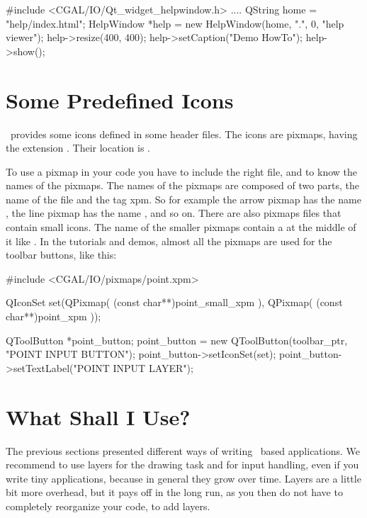 \ccExample
\begin{ccExampleCode}
    #include <CGAL/IO/Qt_widget_helpwindow.h>
	....
    QString home = "help/index.html";
    HelpWindow *help = new HelpWindow(home, ".", 0, "help viewer");
    help->resize(400, 400);
    help->setCaption("Demo HowTo");
    help->show();
\end{ccExampleCode}

\section{Some Predefined Icons}
\label{The predefined icons}

\cgal\ provides some icons defined in some header files. The icons are
pixmaps, having the extension . Their location is .

To use a pixmap in your code you have to include the right file, and
to know the names of the pixmaps. The names of the pixmaps are
composed of two parts, the name of the file and the tag xpm. So for
example the arrow pixmap has the name , the line
pixmap has the name , and so on. There are also 
pixmaps files that contain small icons. The name of the smaller 
pixmaps contain a  at the middle of it like .
In the tutorials and demos, almost all the pixmaps are used for the 
toolbar buttons, like this:

\ccExample
\begin{ccExampleCode}
    
    #include <CGAL/IO/pixmaps/point.xpm>
    
    QIconSet set(QPixmap( (const char**)point_small_xpm ),
                  QPixmap( (const char**)point_xpm ));

    QToolButton *point_button;
    point_button = new QToolButton(toolbar_ptr, "POINT INPUT BUTTON");
    point_button->setIconSet(set);
    point_button->setTextLabel("POINT INPUT LAYER");

\end{ccExampleCode}



\section{What Shall I Use?}

The previous sections presented different ways of writing \qt\ based 
applications. We recommend to use layers for the drawing task and for
input handling, even if you write tiny applications, because in general
they grow over time. Layers are a little bit more overhead, but 
it pays off in the long run, as you then do not have to completely
reorganize your code, to add layers. 








